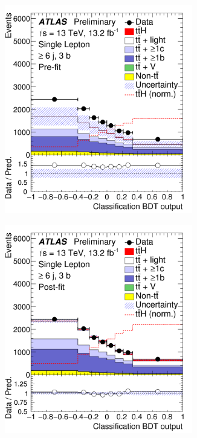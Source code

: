 \begin{figure}[htbp!]
\begin{subfigure}{0.24\textwidth}
  \caption{}
  \label{}
\end{subfigure}
\begin{subfigure}{0.24\textwidth}
  \centering
  \includegraphics[width=0.9\textwidth]{figures/ttH/fig_11c.png}
  \caption{}
  \label{}
\end{subfigure}
\begin{subfigure}{0.24\textwidth}
  \centering
  \includegraphics[width=0.9\textwidth]{figures/ttH/fig_11d.png}

\end{subfigure}
\end{figure}
